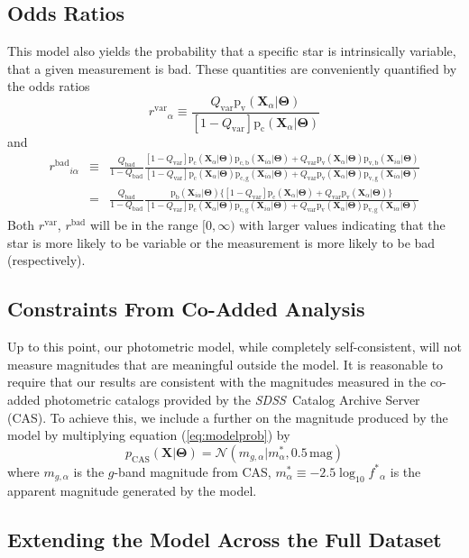 \documentclass[12pt,preprint]{aastex}
\newcommand{\project}[1]{\textsl{#1}}
\newcommand{\SDSS}{\project{SDSS}}
\renewcommand{\eqref}[1]{\ref{eq:#1}}
\newcommand{\eq}[1]{equation (\eqref{#1})}
\newcommand{\paramvector}[1]{\boldsymbol{#1}}
\newcommand{\normal}[3]{\mathcal{N} (#1 | #2, #3)}
\renewcommand{\Pr}{\mathrm{p}}
\newcommand{\model}     {\ensuremath{\paramvector{\Theta}} }
\newcommand{\data}      {\ensuremath{\mathbf{X}} }
\newcommand{\X}         {\ensuremath{\mathbf{X}} }
\newcommand{\fstar}     {\ensuremath{f^*} }
\newcommand{\Qbad}      {\ensuremath{Q_\mathrm{bad}} }
\newcommand{\Qvar}      {\ensuremath{Q_\mathrm{var}} }
\newcommand{\oddsvar}   {\ensuremath{r^\mathrm{var}} }
\newcommand{\oddsbad}   {\ensuremath{r^\mathrm{bad}} }
\newcommand{\pconst}    {\ensuremath{\Pr_\mathrm{c} (\X_\alpha | \model) }}
\newcommand{\pvar}      {\ensuremath{\Pr_\mathrm{v} (\X_\alpha | \model) }}
\newcommand{\pbad}      {\ensuremath{\Pr_\mathrm{b} (\X_{i\alpha} | \model)} }
\newcommand{\pvarbad}   {\ensuremath{\Pr_\mathrm{v,b} (\X_{i\alpha} | \model)} }
\newcommand{\pvargood}  {\ensuremath{\Pr_\mathrm{v,g} (\X_{i\alpha} | \model)} }
\newcommand{\pconstbad} {\ensuremath{\Pr_\mathrm{c,b} (\X_{i\alpha} | \model)} }
\newcommand{\pconstgood}{\ensuremath{\Pr_\mathrm{c,g} (\X_{i\alpha} | \model)} }
\newcommand{\unit}[1]{\,\mathrm{#1}}
\begin{document}
\subsection{Odds Ratios}

This model also yields the probability that a specific star is intrinsically
variable, that a given measurement is bad.  These quantities are conveniently
quantified by the odds ratios
\begin{equation}
    \oddsvar_\alpha \equiv \frac{\Qvar \pvar}{[1-\Qvar] \pconst}
\end{equation}
and
\begin{eqnarray}
    \oddsbad_{i\alpha} & \equiv & \frac{\Qbad}{1-\Qbad}
        \frac{[1-\Qvar] \pconst \pconstbad + \Qvar \pvar \pvarbad}
             {[1-\Qvar] \pconst \pconstgood+ \Qvar \pvar \pvargood} \\
    & = & \frac{\Qbad}{1-\Qbad} \frac{\pbad \{ [1-\Qvar] \pconst + \Qvar \pvar \}}
             {[1-\Qvar] \pconst \pconstgood+ \Qvar \pvar \pvargood}
\end{eqnarray}
Both $\oddsvar$, $\oddsbad$ will be in the range $ [0,\infty ) $ with larger
values indicating that the star is more likely to be variable or the measurement is
more likely to be bad (respectively).


\subsection{Constraints From Co-Added Analysis}

Up to this point, our photometric model, while completely self-consistent, will
not measure magnitudes that are meaningful outside the model.  It is reasonable
to require that our results are consistent with the magnitudes measured in
the co-added photometric catalogs provided by the \SDSS\ Catalog Archive Server
(CAS).  To achieve this, we include a further on the magnitude produced by the
model by multiplying \eq{modelprob} by
\begin{equation}
    p_\mathrm{CAS} (\data | \model) = \normal{m_{g,\alpha}}{m^*_\alpha}{0.5 \unit{mag}}
\end{equation}
where $m_{g,\alpha}$ is the $g$-band magnitude from CAS, $m^*_\alpha
\equiv -2.5\log_{10} \fstar_\alpha$ is the apparent magnitude generated
by the model.



\subsection{Extending the Model Across the Full Dataset}
\end{document}
